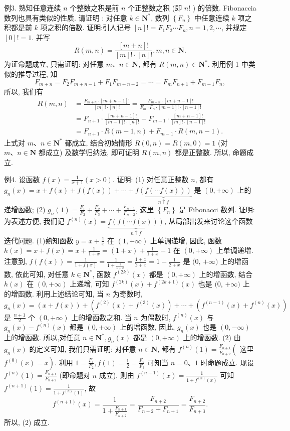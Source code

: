 例3. 熟知任意连续 $n$ 个整数之积是前 $n$ 个正整数之积 (即 $n !$ ) 的倍数.
Fibonaccia 数列也具有类似的性质.
请证明 : 对任意 $k \in \mathbf{N}^*$, 数列 $\left\{F_n\right\}$ 中任意连续 $k$ 项之积都是前 $k$ 项之积的倍数.
证明:引人记号 $[n] !=F_1 F_2 \cdots F_n, n=1,2, \cdots$, 并规定 $[0] !=1$. 并写
$$
R(m, n)=\frac{[m+n] !}{[m] ! \cdot[n] !}, m, n \in \mathbf{N} .
$$
为证命题成立, 只需证明: 对任意 $m 、 n \in \mathbf{N}$, 都有 $R(m, n) \in \mathbf{N}^*$. 利用例 1 中类似的推导过程, 知
$$
F_{m+n}=F_2 F_{m+n-1}+F_1 F_{m+n-2}=\cdots=F_m F_{n+1}+F_{m-1} F_n,
$$
所以, 我们有
$$
\begin{aligned}
R(m, n) & =\frac{F_{m+n} \cdot[m+n-1] !}{[m] ! \cdot[n] !}=\frac{F_{m+n} \cdot[m+n-1] !}{F_m \cdot F_n \cdot[m-1] ! \cdot[n-1] !} \\
& =F_{n+1} \cdot \frac{[m+n-1] !}{[m-1] ! \cdot[n] !}+F_{m-1} \cdot \frac{[m+n-1] !}{[m] ! \cdot[n-1] !} \\
& =F_{n+1} \cdot R(m-1, n)+F_{m-1} \cdot R(m, n-1) .
\end{aligned}
$$
上式对 $m 、 n \in \mathbf{N}^*$ 都成立, 结合初始情形 $R(0, n)=R(m, 0)=1$ (对 $m 、 n \in \mathbf{N}$ 都成立) 及数学归纳法, 即可证明 $R(m, n)$ 都是正整数.
所以, 命题成立.



例4. 设函数 $f(x)=\frac{1}{x+1}(x>0)$. 证明:
(1) 对任意正整数 $n$, 都有 $g_n(x)=x+f(x)+f(f(x))+\cdots+ \underbrace{f(f(\cdots f(x)))}_{n \uparrow f}$ 是 $(0,+\infty)$ 上的递增函数;
(2) $g_n(1)=\frac{F_1}{F_2}+\frac{F_2}{F_3}+\cdots+\frac{F_{n+1}}{F_{n+2}}$, 这里 $\left\{F_n\right\}$ 是 Fibonacci 数列.
证明:为表述方便, 我们记 $f^{(n)}(x)=\underbrace{f(f(\cdots f(x)))}_{n \uparrow f}$, 从局部出发来讨论这个函数迭代问题.
(1)熟知函数 $y=x+\frac{1}{x}$ 在 $(1,+\infty)$ 上单调递增, 因此, 函数 $h(x)= x+f(x)=x+\frac{1}{1+x}=(1+x)+\frac{1}{1+x}-1$ 在 $(0,+\infty)$ 上单调递增.
注意到, $f(f(x))=\frac{1}{1+f(x)}=\frac{1}{1+\frac{1}{1+x}}=\frac{1+x}{2+x}=1-\frac{1}{2+x}$ 是 $(0$, $+\infty)$ 上的增函数, 依此可知, 对任意 $k \in \mathbf{N}^*$, 函数 $f^{(2 k)}(x)$ 都是 $(0,+\infty)$ 上的增函数, 结合 $h(x)$ 在 $(0,+\infty)$ 上递增, 可知 $f^{(2 k)}(x)+f^{(2 k+1)}(x)$ 也是 $(0$, $+\infty)$ 上的增函数.
利用上述结论可知,
当 $n$ 为奇数时,
$$
g_n(x)=(x+f(x))+\left(f^{(2)}(x)+f^{(3)}(x)\right)+\cdots+\left(f^{(n-1)}(x)+f^{(n)}(x)\right)
$$
是 $\frac{n+1}{2}$ 个 $(0,+\infty)$ 上的增函数之和.
当 $n$ 为偶数时, $f^{(n)}(x)$ 与 $g_n(x)-f^{(n)}(x)$ 都是 $(0,+\infty)$ 上的增函数, 因此, $g_n(x)$ 也是 $(0,-\infty)$ 上的增函数.
所以,对任意 $n \in \mathbf{N}^*, g_n(x)$ 都是 $(0,+\infty)$ 上的增函数.
(2) 由 $g_n(x)$ 的定义可知, 我们只需证明: 对任意 $n \in \mathbf{N}$, 都有 $f^{(n)}(1)= \frac{F_{n+1}}{F_{n+2}}\left(\right.$ 这里 $\left.f^{(0)}(x)=x\right)$.
利用 $1=\frac{F_1}{F_2}, f(1)=\frac{1}{2}=\frac{F_2}{F_3}$ 可知当 $n=0 、 1$ 时命题成立.
现设 $f^{(n)}(1)= \frac{F_{n+1}}{F_{n+2}}$ (即命题对 $n$ 成立), 则由 $f^{(n+1)}(x)=\frac{1}{1+f^{(n)}(x)}$ 可知 $f^{(n+1)}(1)= \frac{1}{1+f^{(n)}(1)}$, 故
$$
f^{(n+1)}(x)=\frac{1}{1+\frac{F_{n+1}}{F_{n+2}}}=\frac{F_{n+2}}{F_{n+2}+F_{n+1}}=\frac{F_{n+2}}{F_{n+3}} .
$$
所以, (2) 成立.



